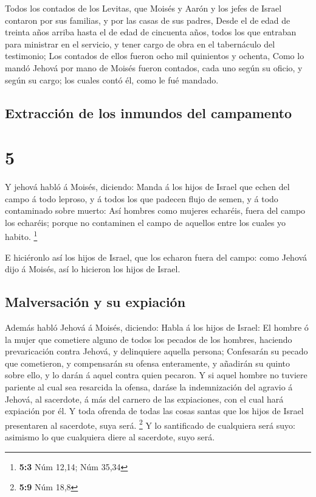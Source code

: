  Todos los contados de los Levitas, que Moisés y Aarón y
los jefes de Israel contaron por sus familias, y por las casas de sus
padres,  Desde el de edad de treinta años arriba hasta el
de edad de cincuenta años, todos los que entraban para ministrar en el
servicio, y tener cargo de obra en el tabernáculo del testimonio;
 Los contados de ellos fueron ocho mil quinientos y
ochenta,  Como lo mandó Jehová por mano de Moisés fueron
contados, cada uno según su oficio, y según su cargo; los cuales contó
él, como le fué mandado.

\hypertarget{extracciuxf3n-de-los-inmundos-del-campamento}{%
\subsection{Extracción de los inmundos del
campamento}\label{extracciuxf3n-de-los-inmundos-del-campamento}}

\hypertarget{section-4}{%
\section{5}\label{section-4}}

 Y jehová habló á Moisés, diciendo:  Manda á los
hijos de Israel que echen del campo á todo leproso, y á todos los que
padecen flujo de semen, y á todo contaminado sobre muerto: 
Así hombres como mujeres echaréis, fuera del campo los echaréis; porque
no contaminen el campo de aquellos entre los cuales yo habito.
\footnote{\textbf{5:3} Núm 12,14; Núm 35,34}

 E hiciéronlo así los hijos de Israel, que los echaron fuera
del campo: como Jehová dijo á Moisés, así lo hicieron los hijos de
Israel.

\hypertarget{malversaciuxf3n-y-su-expiaciuxf3n}{%
\subsection{Malversación y su
expiación}\label{malversaciuxf3n-y-su-expiaciuxf3n}}

 Además habló Jehová á Moisés, diciendo:  Habla
á los hijos de Israel: El hombre ó la mujer que cometiere alguno de
todos los pecados de los hombres, haciendo prevaricación contra Jehová,
y delinquiere aquella persona;  Confesarán su pecado que
cometieron, y compensarán su ofensa enteramente, y añadirán su quinto
sobre ello, y lo darán á aquel contra quien pecaron.  Y si
aquel hombre no tuviere pariente al cual sea resarcida la ofensa, daráse
la indemnización del agravio á Jehová, al sacerdote, á más del carnero
de las expiaciones, con el cual hará expiación por él.  Y
toda ofrenda de todas las cosas santas que los hijos de Israel
presentaren al sacerdote, suya será. \footnote{\textbf{5:9} Núm 18,8}
 Y lo santificado de cualquiera será suyo: asimismo lo que
cualquiera diere al sacerdote, suyo será.


